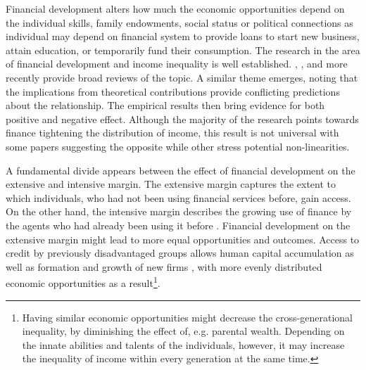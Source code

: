 \begin{refsection}



Financial development alters how much the economic opportunities depend on the individual skills, family endowments, social status or political connections as individual may depend on financial system to provide loans to start new business, attain education, or temporarily fund their consumption. The research in the area of financial development and income inequality is well established. \textcite{demirgucc2009finance}, \textcite{claessens2007finance}, and more recently \textcite{de2017finance} provide broad reviews of the topic. A similar theme emerges, noting that the implications from theoretical contributions provide conflicting predictions about the relationship. The empirical results then bring evidence for both positive and negative effect. Although the majority of the research points towards finance tightening the distribution of income, this result is not universal with some papers suggesting the opposite while other stress potential non-linearities.

A fundamental divide appears between the effect of financial development on the extensive and intensive margin. The extensive margin captures the extent to which individuals, who had not been using financial services before, gain access. On the other hand, the intensive margin describes the growing use of finance by the agents who had already been using it before \parencite{demirgucc2009finance}. Financial development on the extensive margin might lead to more equal opportunities and outcomes. Access to credit by previously disadvantaged groups allows human capital accumulation \parencite{galorzeira1993income, galormoav2004, braunetal2019} as well as formation and growth of new firms \parencite{evans1989estimated, banerjeenewman1990}, with more evenly distributed economic opportunities as a result\footnote{Having similar economic opportunities might decrease the cross-generational inequality, by diminishing the effect of, e.g. parental wealth. Depending on the innate abilities and talents of the individuals, however, it may increase the inequality of income within every generation at the same time.}.


\end{refsection}
